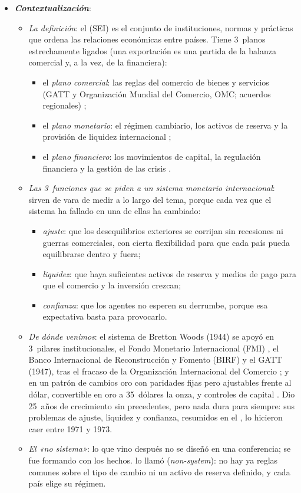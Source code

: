 \documentclass[11pt]{article}
\begin{document}
\begin{itemize}
\item \textbf{\emph{Contextualización}}:
  \begin{itemize}
  \item \emph{La definición}: el  (SEI) es el conjunto de instituciones, normas y prácticas que ordena las relaciones económicas entre países. Tiene 3~planos estrechamente ligados (una exportación es una partida de la balanza comercial y, a la vez, de la financiera):
    \begin{itemize}
    \item el \emph{plano comercial}: las reglas del comercio de bienes y servicios (GATT y Organización Mundial del Comercio, OMC; acuerdos regionales) ;
    \item el \emph{plano monetario}: el régimen cambiario, los activos de reserva y la provisión de liquidez internacional ;
    \item el \emph{plano financiero}: los movimientos de capital, la regulación financiera y la gestión de las crisis  .
    \end{itemize}
  \item \emph{Las 3~funciones que se piden a un sistema monetario internacional}: sirven de vara de medir a lo largo del tema, porque cada vez que el sistema ha fallado en una de ellas ha cambiado:
    \begin{itemize}
    \item \emph{ajuste}: que los desequilibrios exteriores se corrijan sin recesiones ni guerras comerciales, con cierta flexibilidad para que cada país pueda equilibrarse dentro y fuera;
    \item \emph{liquidez}: que haya suficientes activos de reserva y medios de pago para que el comercio y la inversión crezcan;
    \item \emph{confianza}: que los agentes no esperen su derrumbe, porque esa expectativa basta para provocarlo.
    \end{itemize}
  \item \emph{De dónde venimos}: el sistema de Bretton Woods (1944) se apoyó en 3~pilares institucionales, el Fondo Monetario Internacional (FMI) , el Banco Internacional de Reconstrucción y Fomento (BIRF)  y el GATT (1947), tras el fracaso de la Organización Internacional del Comercio ; y en un patrón de cambios oro con paridades fijas pero ajustables frente al dólar, convertible en oro a 35~dólares la onza, y controles de capital . Dio 25~años de crecimiento sin precedentes, pero nada dura para siempre: sus problemas de ajuste, liquidez y confianza, resumidos en el , lo hicieron caer entre 1971 y 1973\nocite{Triffin1960}.
  \item \emph{El «no sistema»}: lo que vino después no se diseñó en una conferencia; se fue formando con los hechos. \textcite{Williamson1976Benefits} lo llamó  (\emph{non-system}): no hay ya reglas comunes sobre el tipo de cambio ni un activo de reserva definido, y cada país elige su régimen.
  \end{itemize}


\end{itemize}
\end{document}
